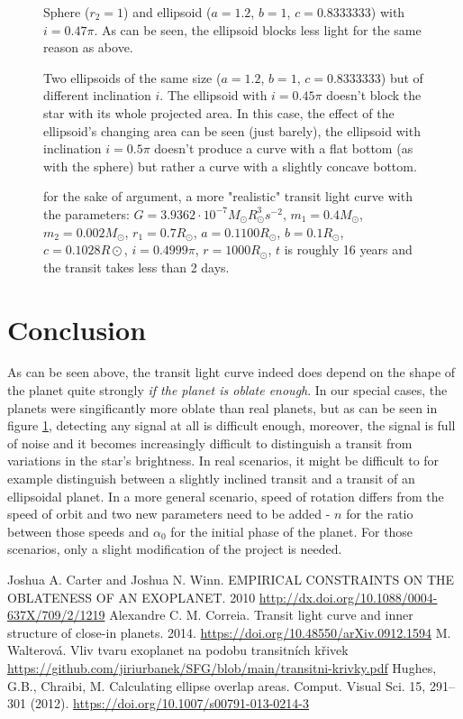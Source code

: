 \documentclass[10pt]{article}
\numberwithin{equation}{subsection}
\begin{document}
\begin{figure}[H]
  \centering
  
  \caption{Sphere ($r_2=1$) and ellipsoid ($a=1.2$, $b=1$, $c=0.8333333$) with $i=0.47\pi$.
  As can be seen, the ellipsoid blocks less light for the same reason as above.}
\end{figure}
\begin{figure}[H]
  \centering
  
  \caption{Two ellipsoids of the same size ($a=1.2$, $b=1$, $c=0.8333333$) but of different
  inclination $i$. The ellipsoid with $i=0.45\pi$ doesn't block the star with its whole
  projected area. In this case, the effect of the ellipsoid's changing area can be seen
  (just barely), the ellipsoid with inclination $i=0.5\pi$ doesn't produce a curve
  with a flat bottom (as with the sphere) but rather a curve with a slightly concave
  bottom.}
\end{figure}
\begin{figure}[H]
  \centering
  
  \caption{for the sake of argument, a more "realistic" transit light curve with the parameters:
  $G = 3.9362\cdot 10^{-7}M_\odot R^3_\odot s^{-2}$, $m_1 = 0.4M_\odot$, $m_2 = 0.002M_\odot$, $r_1 = 0.7R_\odot$, $a = 0.1100R_\odot$, $b = 0.1R_\odot$, $c = 0.1028R\odot$, $i = 0.4999\pi$, $r = 1000R_\odot$,
  $t$ is roughly 16 years and the transit takes less than 2 days.}
  \label{fig:6}
\end{figure}
\section{Conclusion}
As can be seen above, the transit light curve indeed does depend on the shape of the planet
quite strongly \emph{if the planet is oblate enough}. In our special cases, the planets
were singificantly more oblate than real planets, but as can be seen in figure \ref{fig:6},
detecting any signal at all is difficult enough, moreover, the signal is full of noise
and it becomes increasingly difficult to distinguish a transit from variations in the star's
brightness. In real scenarios, it might be difficult to for example distinguish between
a slightly inclined transit and a transit of an ellipsoidal planet. In a more general
scenario, speed of rotation differs from the speed of orbit and two new parameters
need to be added - $n$ for the ratio between those speeds and $\alpha_0$ for the
initial phase of the planet. For those scenarios,
only a slight modification of the project is needed.
\begin{thebibliography}{5}
   Joshua A. Carter and Joshua N. Winn. EMPIRICAL CONSTRAINTS ON THE OBLATENESS OF AN EXOPLANET. 2010 \url{http://dx.doi.org/10.1088/0004-637X/709/2/1219}
   Alexandre C. M. Correia. Transit light curve and inner structure of close-in planets. 2014. \url{https://doi.org/10.48550/arXiv.0912.1594}
   M. Walterová. Vliv tvaru exoplanet na podobu transitních křivek \url{https://github.com/jiriurbanek/SFG/blob/main/transitni-krivky.pdf}
   Hughes, G.B., Chraibi, M. Calculating ellipse overlap areas. Comput. Visual Sci. 15, 291–301 (2012). \url{https://doi.org/10.1007/s00791-013-0214-3}
\end{thebibliography}
\end{document}
